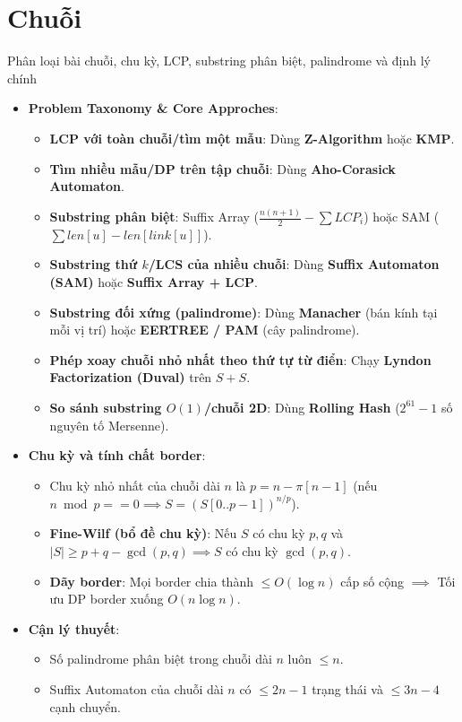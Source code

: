 \section{Chuỗi}

{Phân loại bài chuỗi, chu kỳ, LCP, substring phân biệt, palindrome và định lý chính}
{}
{}{}

\begin{itemize}
    \item \textbf{Problem Taxonomy \& Core Approches}:
    \begin{itemize}
        \item \textbf{LCP với toàn chuỗi/tìm một mẫu}: Dùng \textbf{Z-Algorithm} hoặc \textbf{KMP}.
        \item \textbf{Tìm nhiều mẫu/DP trên tập chuỗi}: Dùng \textbf{Aho-Corasick Automaton}.
        \item \textbf{Substring phân biệt}: Suffix Array ($\frac{n(n+1)}{2} - \sum LCP_i$) hoặc SAM ($\sum len[u] - len[link[u]]$).
        \item \textbf{Substring thứ $k$/LCS của nhiều chuỗi}: Dùng \textbf{Suffix Automaton (SAM)} hoặc \textbf{Suffix Array + LCP}.
        \item \textbf{Substring đối xứng (palindrome)}: Dùng \textbf{Manacher} (bán kính tại mỗi vị trí) hoặc \textbf{EERTREE / PAM} (cây palindrome).
        \item \textbf{Phép xoay chuỗi nhỏ nhất theo thứ tự từ điển}: Chạy \textbf{Lyndon Factorization (Duval)} trên $S + S$.
        \item \textbf{So sánh substring $O(1)$/chuỗi 2D}: Dùng \textbf{Rolling Hash} ($2^{61}-1$ số nguyên tố Mersenne).
    \end{itemize}
    \item \textbf{Chu kỳ và tính chất border}:
    \begin{itemize}
        \item Chu kỳ nhỏ nhất của chuỗi dài $n$ là $p = n - \pi[n - 1]$ (nếu $n \bmod p == 0 \implies S = (S[0..p-1])^{n/p}$).
        \item \textbf{Fine-Wilf (bổ đề chu kỳ)}: Nếu $S$ có chu kỳ $p, q$ và $|S| \ge p + q - \gcd(p, q) \implies S$ có chu kỳ $\gcd(p, q)$.
        \item \textbf{Dãy border}: Mọi border chia thành $\le O(\log n)$ cấp số cộng $\implies$ Tối ưu DP border xuống $O(n \log n)$.
    \end{itemize}
    \item \textbf{Cận lý thuyết}:
    \begin{itemize}
        \item Số palindrome phân biệt trong chuỗi dài $n$ luôn $\le n$.
        \item Suffix Automaton của chuỗi dài $n$ có $\le 2n - 1$ trạng thái và $\le 3n - 4$ cạnh chuyển.
    \end{itemize}
\end{itemize}

